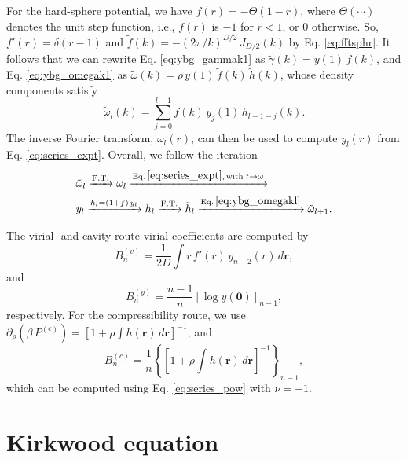 \documentclass[aip,jcp,preprint,superscriptaddress,showpacs,preprintnumbers,amsmath,amssymb]{revtex4-1}
\numberwithin{equation}{section}
\newcommand{\vct}[1]{\mathbf{#1}}
\providecommand{\vr}{} %
\renewcommand{\vr}{\vct{r}}
\begin{document}
For the hard-sphere potential,
we have
$f(r) = -\Theta(1 - r)$,
where $\Theta(\cdots)$ denotes the unit step function,
i.e., $f(r)$ is $-1$ for $r < 1$, or $0$ otherwise.
%
So,
$f'(r) = \delta(r - 1)$
and
$\tilde f(k) = -(2\pi/k)^{D/2} \, J_{D/2}(k)$
by Eq. \eqref{eq:fftsphr}.
%
It follows that
we can rewrite Eq. \eqref{eq:ybg_gammak1} as
$\tilde \gamma(k) = y(1) \, \tilde f(k)$,
and
Eq. \eqref{eq:ybg_omegak1} as
$\tilde \omega(k) = \rho \, y(1) \, \tilde f(k) \, \tilde h(k)$,
whose density components satisfy
%
%
%
\begin{equation}
\tilde \omega_l(k)
=
\sum_{j = 0}^{l - 1}
\tilde f(k) \, y_j(1) \, \tilde h_{l-1-j}(k).
\label{eq:ybg_omegakl}
\end{equation}
%
%
%
The inverse Fourier transform, $\omega_l(r)$,
can then be used to compute $y_l(r)$ from Eq. \eqref{eq:series_expt}.
%
Overall, we follow the iteration
%
\begin{align*}
&
\tilde \omega_l
  \xrightarrow{ \mathrm{F.T.} }
\omega_l
  \xrightarrow{ \mathrm{Eq.\,\eqref{eq:series_expt},\,with\;} t \rightarrow \omega }
\\
&
y_l
  \xrightarrow{ h_l = (1 + f) \, y_l }
h_l
  \xrightarrow{ \mathrm{F.T.} }
\tilde h_l
  \xrightarrow{ \mathrm{Eq.\,\eqref{eq:ybg_omegakl} } }
\tilde \omega_{l + 1}.
\end{align*}



The virial- and cavity-route virial coefficients are computed by
%
%
%
\begin{equation}
B_n^{(v)}
=
\frac{ 1 } { 2 D }
\int
  r \, f'(r) \, y_{n - 2}(r) \, d\vr,
\label{eq:Bn_virial}
\end{equation}
%
%
%
and
%
%
%
\begin{equation}
B_n^{(y)}
=
\frac{ n - 1 } { n }
\left[
  \log y(\vct 0)
\right]_{n - 1},
\label{eq:Bn_cavity}
\end{equation}
%
%
%
respectively.
%
For the compressibility route,
we use
$\partial_\rho
\left(
  \beta \, P^{(c)}
\right)
=
\left[
  1 + \rho \int h(\vr) \, d\vr
\right]^{-1}$,
%
and
%
\begin{equation}
B_n^{(c)}
=
\frac{ 1 } { n }
\left\{
  \left[
    1 + \rho \int h(\vr) \, d\vr
  \right]^{-1}
\right\}_{n - 1},
\label{eq:Bn_compressibility}
\end{equation}
%
which can be computed using Eq. \eqref{eq:series_pow}
with $\nu = -1$.





\section{\label{sec:kirkwood}Kirkwood equation}
\end{document}
